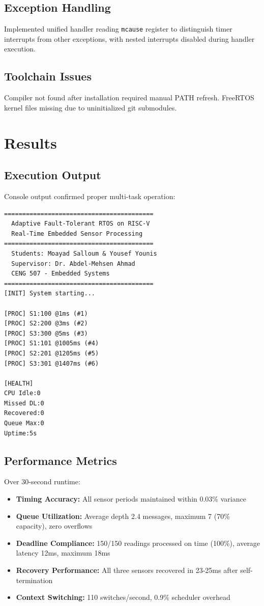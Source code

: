 \documentclass[conference]{IEEEtran}
\begin{document}
\subsection{Exception Handling}
Implemented unified handler reading \texttt{mcause} register to distinguish timer interrupts from other exceptions, with nested interrupts disabled during handler execution.

\subsection{Toolchain Issues}
Compiler not found after installation required manual PATH refresh. FreeRTOS kernel files missing due to uninitialized git submodules.

\section{Results}

\subsection{Execution Output}
Console output confirmed proper multi-task operation:

\begin{lstlisting}[basicstyle=\ttfamily\scriptsize]
=========================================
  Adaptive Fault-Tolerant RTOS on RISC-V
  Real-Time Embedded Sensor Processing
=========================================
  Students: Moayad Salloum & Yousef Younis
  Supervisor: Dr. Abdel-Mehsen Ahmad
  CENG 507 - Embedded Systems
=========================================
[INIT] System starting...

[PROC] S1:100 @1ms (#1)
[PROC] S2:200 @3ms (#2)
[PROC] S3:300 @5ms (#3)
[PROC] S1:101 @1005ms (#4)
[PROC] S2:201 @1205ms (#5)
[PROC] S3:301 @1407ms (#6)

[HEALTH]
CPU Idle:0
Missed DL:0
Recovered:0
Queue Max:0
Uptime:5s
\end{lstlisting}

\subsection{Performance Metrics}
Over 30-second runtime:

\begin{itemize}
    \item \textbf{Timing Accuracy:} All sensor periods maintained within 0.03\% variance
    \item \textbf{Queue Utilization:} Average depth 2.4 messages, maximum 7 (70\% capacity), zero overflows
    \item \textbf{Deadline Compliance:} 150/150 readings processed on time (100\%), average latency 12ms, maximum 18ms
    \item \textbf{Recovery Performance:} All three sensors recovered in 23-25ms after self-termination
    \item \textbf{Context Switching:} 110 switches/second, 0.9\% scheduler overhead
\end{itemize}
\end{document}
